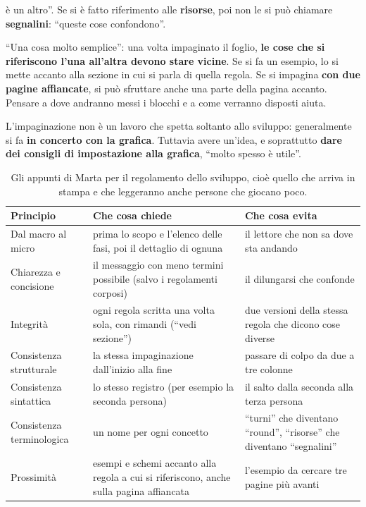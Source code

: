 \begin{description}
        è un altro''. Se si è fatto riferimento alle \textbf{risorse}, poi non le si può
        chiamare \textbf{segnalini}: ``queste cose confondono''.
  \item[Prossimità.] ``Una cosa molto semplice'': una volta impaginato il foglio, \textbf{le
        cose che si riferiscono l'una all'altra devono stare vicine}. Se si fa un esempio,
        lo si mette accanto alla sezione in cui si parla di quella regola. Se si impagina
        \textbf{con due pagine affiancate}, si può sfruttare anche una parte della pagina
        accanto. Pensare a dove andranno messi i blocchi e a come verranno disposti aiuta.
\end{description}

L'impaginazione non è un lavoro che spetta soltanto allo sviluppo: generalmente si fa
\textbf{in concerto con la grafica}. Tuttavia avere un'idea, e soprattutto \textbf{dare dei
consigli di impostazione alla grafica}, ``molto spesso è utile''.

\begin{table}[htbp]
\centering
\small
\begin{tabular}{@{}p{3.1cm}p{5.4cm}p{5.0cm}@{}}
\toprule
\textbf{Principio} & \textbf{Che cosa chiede} & \textbf{Che cosa evita} \\
\midrule
Dal macro al micro & prima lo scopo e l'elenco delle fasi, poi il dettaglio di ognuna &
  il lettore che non sa dove sta andando \\
\addlinespace
Chiarezza e concisione & il messaggio con meno termini possibile (salvo i regolamenti
  corposi) & il dilungarsi che confonde \\
\addlinespace
Integrità & ogni regola scritta una volta sola, con rimandi (``vedi sezione'') & due
  versioni della stessa regola che dicono cose diverse \\
\addlinespace
Consistenza strutturale & la stessa impaginazione dall'inizio alla fine & passare di colpo
  da due a tre colonne \\
\addlinespace
Consistenza sintattica & lo stesso registro (per esempio la seconda persona) & il salto
  dalla seconda alla terza persona \\
\addlinespace
Consistenza terminologica & un nome per ogni concetto & ``turni'' che diventano ``round'',
  ``risorse'' che diventano ``segnalini'' \\
\addlinespace
Prossimità & esempi e schemi accanto alla regola a cui si riferiscono, anche sulla pagina
  affiancata & l'esempio da cercare tre pagine più avanti \\
\bottomrule
\end{tabular}
\caption{Gli appunti di Marta per il regolamento dello sviluppo, cioè quello che arriva in
stampa e che leggeranno anche persone che giocano poco.}
\label{a14:tab:regole}
\end{table}

